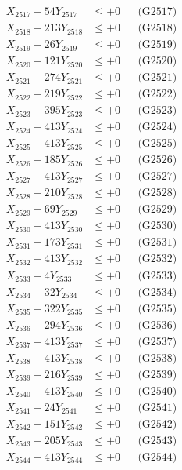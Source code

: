 \documentclass[a4paper,10pt]{article}
\begin{document}
{\begin{align}
X_{2517} - 54Y_{2517} &\leq +0 && \text{(G2517)} \\
X_{2518} - 213Y_{2518} &\leq +0 && \text{(G2518)} \\
X_{2519} - 26Y_{2519} &\leq +0 && \text{(G2519)} \\
X_{2520} - 121Y_{2520} &\leq +0 && \text{(G2520)} \\
\allowbreak
X_{2521} - 274Y_{2521} &\leq +0 && \text{(G2521)} \\
X_{2522} - 219Y_{2522} &\leq +0 && \text{(G2522)} \\
X_{2523} - 395Y_{2523} &\leq +0 && \text{(G2523)} \\
X_{2524} - 413Y_{2524} &\leq +0 && \text{(G2524)} \\
X_{2525} - 413Y_{2525} &\leq +0 && \text{(G2525)} \\
X_{2526} - 185Y_{2526} &\leq +0 && \text{(G2526)} \\
X_{2527} - 413Y_{2527} &\leq +0 && \text{(G2527)} \\
X_{2528} - 210Y_{2528} &\leq +0 && \text{(G2528)} \\
X_{2529} - 69Y_{2529} &\leq +0 && \text{(G2529)} \\
X_{2530} - 413Y_{2530} &\leq +0 && \text{(G2530)} \\
\allowbreak
X_{2531} - 173Y_{2531} &\leq +0 && \text{(G2531)} \\
X_{2532} - 413Y_{2532} &\leq +0 && \text{(G2532)} \\
X_{2533} - 4Y_{2533} &\leq +0 && \text{(G2533)} \\
X_{2534} - 32Y_{2534} &\leq +0 && \text{(G2534)} \\
X_{2535} - 322Y_{2535} &\leq +0 && \text{(G2535)} \\
X_{2536} - 294Y_{2536} &\leq +0 && \text{(G2536)} \\
X_{2537} - 413Y_{2537} &\leq +0 && \text{(G2537)} \\
X_{2538} - 413Y_{2538} &\leq +0 && \text{(G2538)} \\
X_{2539} - 216Y_{2539} &\leq +0 && \text{(G2539)} \\
X_{2540} - 413Y_{2540} &\leq +0 && \text{(G2540)} \\
\allowbreak
X_{2541} - 24Y_{2541} &\leq +0 && \text{(G2541)} \\
X_{2542} - 151Y_{2542} &\leq +0 && \text{(G2542)} \\
X_{2543} - 205Y_{2543} &\leq +0 && \text{(G2543)} \\
X_{2544} - 413Y_{2544} &\leq +0 && \text{(G2544)} \\

\end{align}}
\end{document}
